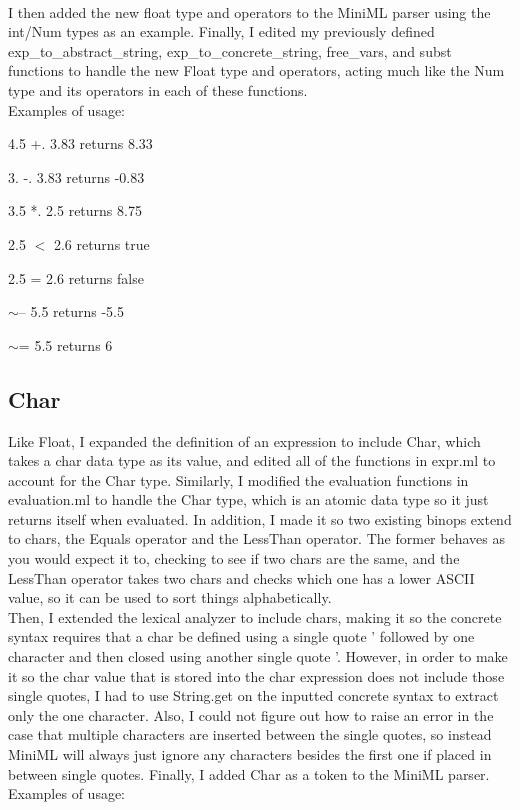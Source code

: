 \documentclass{article}
\begin{document}
 \newline
 \\ I then added the new float type and operators to the MiniML parser using the int/Num types as an example. Finally, I edited my previously defined exp\_to\_abstract\_string, exp\_to\_concrete\_string, free\_vars, and subst functions to handle the new Float type and operators, acting much like the Num type and its operators in each of these functions.
 \newline
 \\ Examples of usage:
 
 4.5 +. 3.83 returns 8.33
 
 3. -. 3.83 returns -0.83
 
 3.5 *. 2.5 returns 8.75
 
 2.5 $<$ 2.6 returns true
 
 2.5 = 2.6 returns false
 
 $\sim$-- 5.5 returns -5.5
 
 $\sim$= 5.5 returns 6

\subsection*{Char}
 Like Float, I expanded the definition of an expression to include Char, which takes a char data type as its value, and edited all of the functions in expr.ml to account for the Char type. Similarly, I modified the evaluation functions in evaluation.ml to handle the Char type, which is an atomic data type so it just returns itself when evaluated. In addition, I made it so two existing binops extend to chars, the Equals operator and the LessThan operator. The former behaves as you would expect it to, checking to see if two chars are the same, and the LessThan operator takes two chars and checks which one has a lower ASCII value, so it can be used to sort things alphabetically.
\newline
 \\ Then, I extended the lexical analyzer to include chars, making it so the concrete syntax requires that a char be defined using a single quote ' followed by one character and then closed using another single quote '. However, in order to make it so the char value that is stored into the char expression does not include those single quotes, I had to use String.get on the inputted concrete syntax to extract only the one character. Also, I could not figure out how to raise an error in the case that multiple characters are inserted between the single quotes, so instead MiniML will always just ignore any characters besides the first one if placed in between single quotes. Finally, I added Char as a token to the MiniML parser.
 \newline
 \\ Examples of usage:
 
\end{document}
